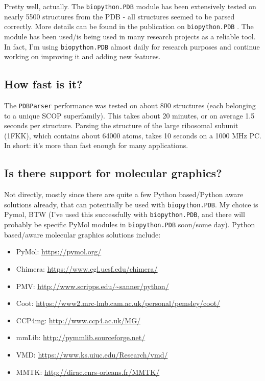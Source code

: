Pretty well, actually. The \verb+biopython.PDB+ module has been extensively tested on nearly
5500 structures from the PDB - all structures seemed to be parsed
correctly. More details can be found in the publication on \verb+biopython.PDB+  \cite[Hamelryck and Manderick, 2003]{hamelryck2003a}. The module has been used/is being used in many research projects
as a reliable tool. In fact, I'm using \verb+biopython.PDB+ almost daily for research
purposes and continue working on improving it and adding new features.

\subsection{How fast is it?}

The \texttt{PDBParser} performance was tested on about 800 structures
(each belonging to a unique SCOP superfamily). This takes about 20
minutes, or on average 1.5 seconds per structure. Parsing the structure
of the large ribosomal subunit (1FKK), which contains about 64000
atoms, takes 10 seconds on a 1000 MHz PC. In short: it's more than
fast enough for many applications.

\subsection{Is there support for molecular graphics?}

Not directly, mostly since there are quite a few Python based/Python
aware solutions already, that can potentially be used with \verb+biopython.PDB+.
My choice is Pymol, BTW (I've used this successfully with \verb+biopython.PDB+,
and there will probably be specific PyMol modules in \verb+biopython.PDB+ soon/some
day). Python based/aware molecular graphics solutions include:

\begin{itemize}
\item PyMol: \url{https://pymol.org/}
\item Chimera: \url{https://www.cgl.ucsf.edu/chimera/}
\item PMV: \url{http://www.scripps.edu/~sanner/python/}
\item Coot: \url{https://www2.mrc-lmb.cam.ac.uk/personal/pemsley/coot/}
\item CCP4mg: \url{http://www.ccp4.ac.uk/MG/}
\item mmLib: \url{http://pymmlib.sourceforge.net/}
\item VMD: \url{https://www.ks.uiuc.edu/Research/vmd/}
\item MMTK: \url{http://dirac.cnrs-orleans.fr/MMTK/}
\end{itemize}

